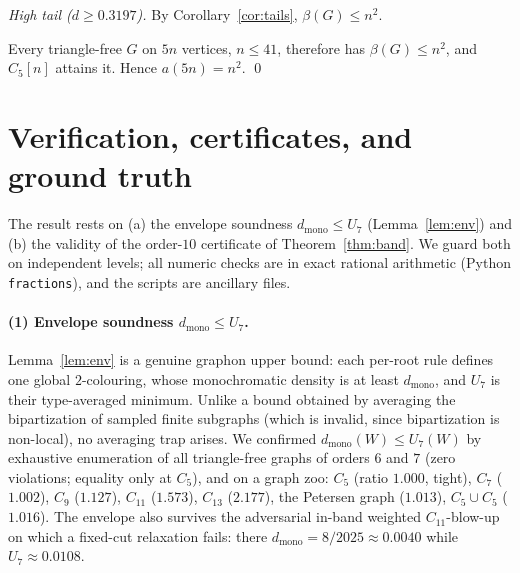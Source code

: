 \documentclass[11pt]{article}
\theoremstyle{remark}
\newcommand{\bip}{\beta}
\newcommand{\dmono}{d_{\mathrm{mono}}}
\begin{document}
\smallskip\noindent\emph{High tail ($d\ge 0.3197$).} By
Corollary~\ref{cor:tails}, $\bip(G)\le n^2$.

\smallskip Every triangle-free $G$ on $5n$ vertices, $n\le 41$, therefore has
$\bip(G)\le n^2$, and $C_5[n]$ attains it. Hence $a(5n)=n^2$. \qed

\section{Verification, certificates, and ground truth}\label{sec:verification}

The result rests on (a) the envelope soundness $\dmono\le U_7$
(Lemma~\ref{lem:env}) and (b) the validity of the order-$10$ certificate of
Theorem~\ref{thm:band}. We guard both on independent levels; all numeric checks are
in exact rational arithmetic (Python \texttt{fractions}), and the scripts are
ancillary files.

\paragraph{(1) Envelope soundness $\dmono\le U_7$.} Lemma~\ref{lem:env} is a
genuine graphon upper bound: each per-root rule defines one global $2$-colouring,
whose monochromatic density is at least $\dmono$, and $U_7$ is their type-averaged
minimum. Unlike a bound obtained by averaging the bipartization of sampled finite
subgraphs (which is invalid, since bipartization is non-local), no averaging trap
arises. We confirmed $\dmono(W)\le U_7(W)$ by exhaustive enumeration of all
triangle-free graphs of orders $6$ and $7$ (zero violations; equality only at
$C_5$), and on a graph zoo: $C_5$ (ratio $1.000$, tight), $C_7$ ($1.002$), $C_9$
($1.127$), $C_{11}$ ($1.573$), $C_{13}$ ($2.177$), the Petersen graph ($1.013$),
$C_5\cup C_5$ ($1.016$). The envelope also survives the adversarial in-band
weighted $C_{11}$-blow-up on which a fixed-cut relaxation fails: there
$\dmono=8/2025\approx 0.0040$ while $U_7\approx 0.0108$.
\end{document}
